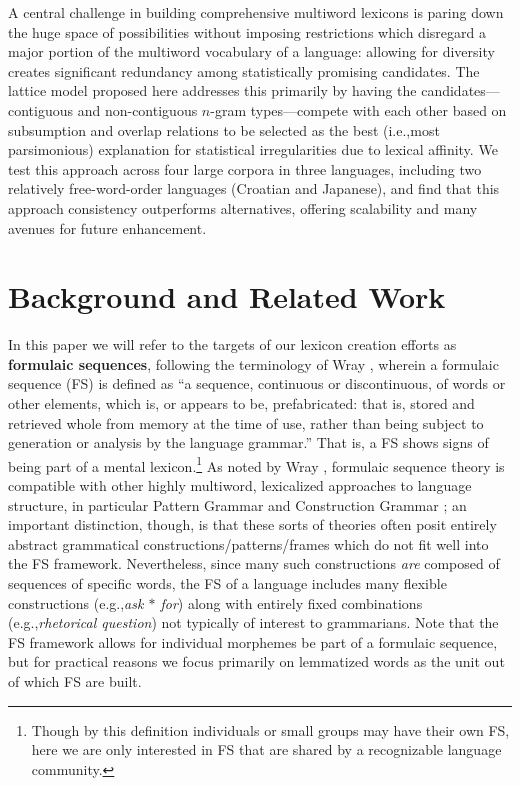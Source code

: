 \documentclass[11pt,letterpaper]{article}
\makeatletter
\def \eg {e.g.,\@ }
\def \ie {i.e.,\@ }
\newcommand{\gap}{$*$\xspace}
\newcommand{\ex}[1]{\textit{#1}\xspace}
\newcommand{\termdef}[1]{\textbf{#1}\xspace}
\makeatother
\begin{document}
A central challenge in building comprehensive multiword lexicons is paring down the huge space of possibilities without imposing restrictions which disregard a major portion of the multiword vocabulary of a language: allowing for diversity creates significant redundancy among statistically promising candidates. The lattice model proposed here addresses this primarily by having the candidates---contiguous and non-contiguous $n$-gram types---compete with each other based on subsumption and overlap relations to be selected as the best (\ie most parsimonious) explanation for statistical irregularities due to lexical affinity. We test this approach across four large corpora in three languages, including two relatively free-word-order languages (Croatian and Japanese), and find that this approach consistency outperforms alternatives, offering scalability and many avenues for future enhancement.




\section{Background and Related Work}

\label{sec:background}

In this paper we will refer to the targets of our lexicon creation efforts as \termdef{formulaic sequences}, following the terminology of Wray , wherein a formulaic sequence (FS) is defined as ``a sequence, continuous or discontinuous, of words or other elements, which is, or appears to be, prefabricated: that is, stored and retrieved whole from memory at the time of use, rather than being subject to generation or analysis by the language grammar.'' That is, a FS shows signs of being part of a mental lexicon.\footnote{Though by this definition individuals or small groups may have their own FS, here we are only interested in FS that are shared by a recognizable language community.} As noted by Wray ,  formulaic sequence theory is compatible with other highly multiword, lexicalized approaches to language structure, in particular Pattern Grammar \cite{PG} and Construction Grammar \cite{ConG}; an important distinction, though, is that these sorts of theories often posit entirely abstract grammatical constructions/patterns/frames which do not fit well into the FS framework. Nevertheless, since many such constructions \textit{are} composed of sequences of specific words, the FS of a language includes many flexible constructions (\eg \ex{ask \gap for}) along with entirely fixed combinations (\eg \ex{rhetorical question}) not typically of interest to grammarians. Note that the FS framework allows for individual morphemes be part of a formulaic sequence, but for practical reasons we focus primarily on lemmatized words as the unit out of which FS are built.
\end{document}
